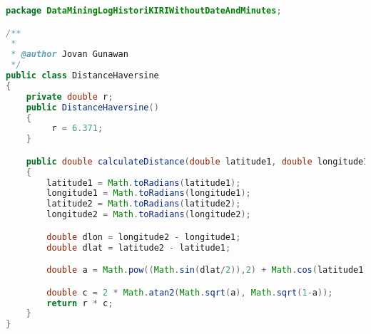 \begin{lstlisting}[language=Java,basicstyle=\tiny,caption=DistanceHaversine.java]
package DataMiningLogHistoriKIRIWithoutDateAndMinutes;

/**
 *
 * @author Jovan Gunawan
 */
public class DistanceHaversine
{
    private double r;
    public DistanceHaversine()
    {
         r = 6.371;
    }

    public double calculateDistance(double latitude1, double longitude1, double latitude2, double longitude2)
    {
        latitude1 = Math.toRadians(latitude1);
        longitude1 = Math.toRadians(longitude1);
        latitude2 = Math.toRadians(latitude2);
        longitude2 = Math.toRadians(longitude2);

        double dlon = longitude2 - longitude1;
        double dlat = latitude2 - latitude1;

        double a = Math.pow((Math.sin(dlat/2)),2) + Math.cos(latitude1) * Math.cos(latitude2) * Math.pow(Math.sin(dlon/2),2);

        double c = 2 * Math.atan2(Math.sqrt(a), Math.sqrt(1-a));
        return r * c;
    }
}
\end{lstlisting}

